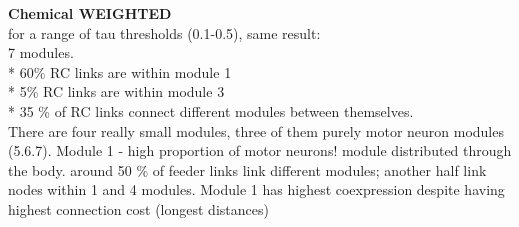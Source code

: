 \documentclass[10pt,letterpaper]{article}
\newlength\savedwidth
\newcommand\thickhline{\noalign{\global\savedwidth\arrayrulewidth\global\arrayrulewidth 2pt}%
\hline
\noalign{\global\arrayrulewidth\savedwidth}}
\begin{document}
\textbf{Chemical WEIGHTED}\\
for a range of tau thresholds (0.1-0.5), same result: \\
7 modules. \\
* 60\% RC links are within module 1\\
* 5\% RC links are within module 3\\
* 35 \% of RC links connect different modules between themselves. \\

There are four really small modules, three of them purely motor neuron modules (5.6.7).
Module 1 - high proportion of motor neurons! module distributed through the body.
around 50 \% of feeder links link different modules; another half link nodes within 1 and 4 modules.
Module 1 has highest coexpression despite having highest connection cost (longest distances)



\end{document}
